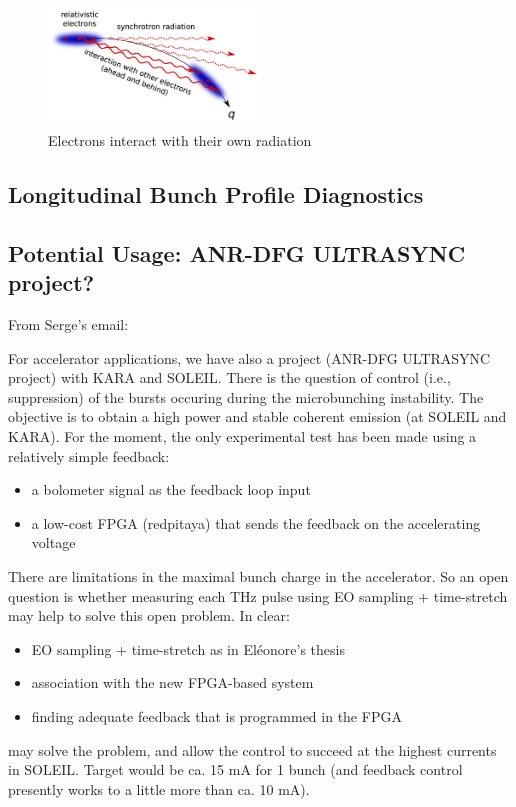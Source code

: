 \begin{figure}[tbh]
	\centering
	\includegraphics[width = 0.5\textwidth]{chap/02-theory/img/microbunching}
	\caption{Electrons interact with their own radiation \cite{Bielawski2019}}
	\label{fig:microBunch}
\end{figure}


\subsection{Longitudinal Bunch Profile Diagnostics}

\subsection{Potential Usage: ANR-DFG ULTRASYNC project?}
From Serge's email:

For accelerator applications, we have also a project (ANR-DFG ULTRASYNC project) with KARA and SOLEIL.
There is the question of control (i.e., suppression) of the bursts occuring during the microbunching instability. The objective is to obtain a high power and stable coherent emission (at SOLEIL and KARA). For the moment, the only experimental test has been made using a relatively simple feedback:
\begin{itemize}
	\item a bolometer signal as the feedback loop input
	\item a low-cost FPGA (redpitaya) that sends the feedback on the accelerating voltage
\end{itemize}

There are limitations in the maximal bunch charge in the accelerator. So an open question is whether measuring each THz pulse using EO sampling + time-stretch may help to solve this open problem. In clear:

\begin{itemize}
	\item EO sampling + time-stretch as in Eléonore's thesis
	\item association with the new FPGA-based system
	\item finding adequate feedback that is programmed in the FPGA
\end{itemize}
may solve the problem, and allow the control to succeed at the highest currents in SOLEIL. 
Target would be ca. 15 mA for 1 bunch (and feedback control presently works to a little more than ca. 10 mA).

